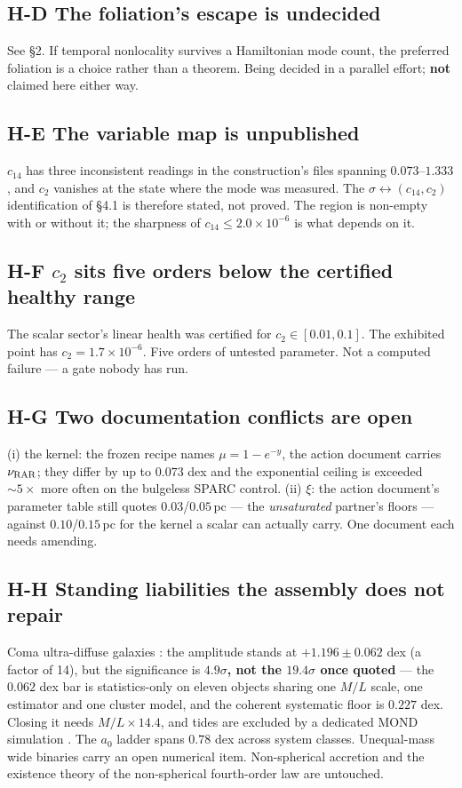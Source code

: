 \documentclass[11pt,letterpaper]{article}
\begin{document}
\subsection{H-D The foliation's escape is undecided}
See \S2. If temporal nonlocality survives a Hamiltonian mode count, the preferred foliation is a choice rather than a theorem. Being decided in a parallel effort; \textbf{not} claimed here either way.

\subsection{H-E The variable map is unpublished}
$c_{14}$ has three inconsistent readings in the construction's files spanning $0.073$--$1.333$, and $c_2$ vanishes at the state where the mode was measured. The $\sigma\leftrightarrow(c_{14},c_2)$ identification of \S4.1 is therefore stated, not proved. The region is non-empty with or without it; the sharpness of $c_{14}\le2.0\times10^{-6}$ is what depends on it.

\subsection{H-F $c_2$ sits five orders below the certified healthy range}
The scalar sector's linear health was certified for $c_2\in[0.01,0.1]$. The exhibited point has $c_2=1.7\times10^{-6}$. Five orders of untested parameter. Not a computed failure --- a gate nobody has run.

\subsection{H-G Two documentation conflicts are open}
(i) the kernel: the frozen recipe names $\mu=1-e^{-y}$, the action document carries $\nu_{\rm RAR}$; they differ by up to $0.073$ dex and the exponential ceiling is exceeded ${\sim}5\times$ more often on the bulgeless SPARC control. (ii) $\xi$: the action document's parameter table still quotes $0.03$/$0.05$\,pc --- the \emph{unsaturated} partner's floors --- against $0.10$/$0.15$\,pc for the kernel a scalar can actually carry. One document each needs amending.

\subsection{H-H Standing liabilities the assembly does not repair}
Coma ultra-diffuse galaxies \cite{freundlich22}: the amplitude stands at $+1.196\pm0.062$ dex (a factor of 14), but the significance is \textbf{$4.9\sigma$, not the $19.4\sigma$ once quoted} --- the $0.062$ dex bar is statistics-only on eleven objects sharing one $M/L$ scale, one estimator and one cluster model, and the coherent systematic floor is $0.227$ dex. Closing it needs $M/L\times14.4$, and tides are excluded by a dedicated MOND simulation \cite{nagesh24}. The $a_0$ ladder spans $0.78$ dex across system classes. Unequal-mass wide binaries carry an open numerical item. Non-spherical accretion and the existence theory of the non-spherical fourth-order law are untouched.
\end{document}
